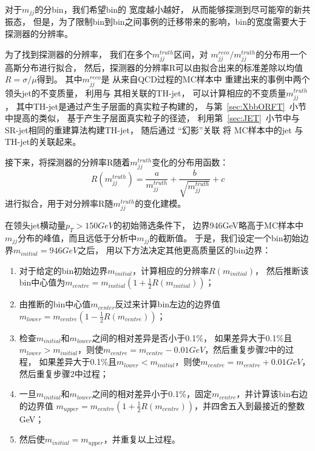 对于$m_{jj}$的分bin，我们希望bin的
宽度越小越好，
从而能够探测到尽可能窄的新共振态，
但是，为了限制bin到bin之间事例的迁移带来的影响，bin的宽度需要大于探测器的分辨率。

为了找到探测器的分辨率，
我们在多个$m_{jj}^{truth}$区间，对
$m_{jj}^{reco}/m_{jj}^{truth}$的分布用一个高斯分布进行拟合，
然后，探测器的分辨率R可以由拟合出来的标准差除以均值$R=\sigma/\mu$得到。
其中$m_{jj}^{reco}$是
从来自QCD过程的MC样本中
重建出来的事例中两个领头jet的不变质量，
利用与
其相关联的TH-jet，
可以计算相应的不变质量$m_{jj}^{truth}$，
其中TH-jet是通过产生子层面的真实粒子构建的，
与第~\ref{sec:XbbORFT}~小节中提高的类似，
基于产生子层面真实粒子的径迹，
利用第~\ref{sec:JET}~小节中与SR-jet相同的重建算法构建TH-jet，
随后通过
“幻影”关联
将
MC样本中的jet
与TH-jet的关联起来。

接下来，将探测器的分辨率R随着$m_{jj}^{truth}$变化的分布用函数：
\begin{equation} 
\label{eq:MJJR1}
R(m_{jj}^{truth})=\frac{a}{m_{jj}^{truth}}+\frac{b}{\sqrt{m_{jj}^{truth}}}+c
\end{equation}
进行拟合，用于对分辨率R随$m_{jj}^{truth}$的变化建模。

在领头jet横动量$p_T>150GeV$的初始筛选条件下，
边界946GeV略高于MC样本中$m_{jj}$分布的峰值，而且远低于分析中$m_{jj}$的截断值。
于是，我们设定一个bin初始边界$m_{initial}=946GeV$之后，
用以下方法决定其他更高质量区的bin边界：
\begin{enumerate}
  \item 对于给定的bin初始边界$m_{initial}$，计算相应的分辨率$R(m_{initial})$，
  然后推断该bin中心值为$m_{centre}=m_{initial}(1+\frac{1}{2}R(m_{initial}))$；
  \item 由推断的bin中心值$m_{center}$反过来计算bin左边的边界值
  $m_{lower}=m_{centre}(1-\frac{1}{2}R(m_{centre}))$；
  \item 检查$m_{initial}$和$m_{lower}$之间的相对差异是否小于0.1\%，
  如果差异大于0.1\%且$m_{lower}>m_{initial}$，则使$m_{centre}=m_{centre}-0.01GeV$，然后重复步骤2中的过程，
 如果差异大于0.1\%且$m_{lower}<m_{initial}$，则使$m_{centre}=m_{centre}+0.01GeV$，然后重复步骤2中过程；
  \item 一旦$m_{initial}$和$m_{lower}$之间的相对差异小于0.1\%，固定$m_{centre}$，并计算该bin右边的边界值
  $m_{upper}=m_{centre}(1+\frac{1}{2}R(m_{centre}))$，并四舍五入到最接近的整数GeV；
  \item 然后使$m_{initial}=m_{upper}$，并重复以上过程。
\end{enumerate}












